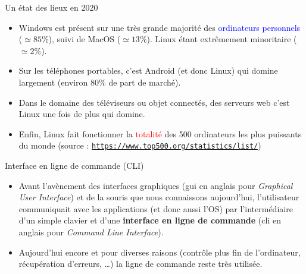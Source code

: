 \documentclass[10pt]{beamer}
\begin{document}
\begin{frame}
	\mframe{\Systeme}
	\begin{block}{Un état des lieux en 2020}
		\begin{itemize}
			\item<1-> Windows est présent sur une très grande majorité des \textcolor{blue}{ordinateurs personnels} ($\simeq 85 \%$), suivi de MacOS ($\simeq 13\%$). Linux étant extrêmement minoritaire ($\simeq 2\%$).
			\item<2-> Sur les téléphones portables, c'est Android (et donc Linux) qui domine largement (environ $80 \% $ de part de marché).
			\item<3-> Dans le domaine des téléviseurs ou objet connectés, des serveurs web c'est Linux une fois de plus qui domine.
			\item<4-> Enfin, Linux fait fonctionner la \textcolor{red}{totalité} des 500 ordinateurs les plus puissants du monde (source : \texttt{\href{https://www.top500.org/statistics/list/}{https://www.top500.org/statistics/list/}})
		\end{itemize}
	\end{block}
\end{frame}

\begin{frame}
	\mframe{\Systeme}
	\begin{block}{Interface en ligne de commande (CLI)}
		\begin{itemize}
			\item<1-> Avant l'avènement des interfaces graphiques ({\sc gui} en anglais pour \textit{Graphical User Interface}) et de la souris que nous connaissons aujourd'hui, l'utilisateur communiquait avec les applications (et donc aussi l'OS) par l'intermédiaire d'un simple clavier et d'une \textbf{interface en ligne de commande} ({\sc cli} en anglais pour \textit{Command Line Interface}).
			\item<2-> Aujourd'hui encore et pour diverses raisons (contrôle plus fin de l'ordinateur, récupération d'erreurs, \dots) la ligne de commande reste très utilisée.
		\end{itemize}
	\end{block}
\end{frame}
\end{document}
